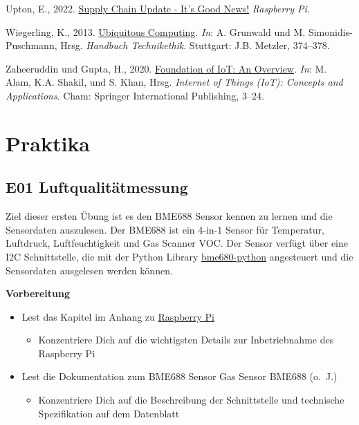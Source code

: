 \documentclass[
  11pt,
  a4paper,
  oneside, openany  ,captions=tableheading
]{scrbook}
\providecommand{\tightlist}{%
  \setlength{\itemsep}{0pt}\setlength{\parskip}{0pt}}
\newlength{\cslhangindent}
\newenvironment{CSLReferences}[2] %
  {\begin{list}{}{%
   \setlength{\itemindent}{0pt}
   \setlength{\leftmargin}{0pt}
   \setlength{\parsep}{0pt}
   \ifodd #1
    \setlength{\leftmargin}{\cslhangindent}
    \setlength{\itemindent}{-1\cslhangindent}
   \fi
   \setlength{\itemsep}{#2\baselineskip}}}
  {\end{list}}
\theoremstyle{remark}
\begin{document}
\begin{CSLReferences}{1}{0}
Upton, E., 2022.
\href{https://www.raspberrypi.com/news/supply-chain-update-its-good-news/}{Supply
Chain Update - It's Good News!} \emph{Raspberry Pi}.

Wiegerling, K., 2013.
\href{https://doi.org/10.1007/978-3-476-05333-6_71}{{Ubiquitous
Computing}}. \emph{In}: A. Grunwald und M. Simonidis-Puschmann, Hrsg.
\emph{{Handbuch Technikethik}}. {Stuttgart}: {J.B. Metzler}, 374--378.

Zaheeruddin und Gupta, H., 2020.
\href{https://doi.org/10.1007/978-3-030-37468-6_1}{Foundation of {IoT}:
{An Overview}}. \emph{In}: M. Alam, K.A. Shakil, und S. Khan, Hrsg.
\emph{Internet of {Things} ({IoT}): {Concepts} and {Applications}}.
{Cham}: {Springer International Publishing}, 3--24.

\end{CSLReferences}

\part{Praktika}

\chapter*{E01 Luftqualitätmessung}\label{e01-luftqualituxe4tmessung}


Ziel dieser ersten Übung ist es den BME688 Sensor kennen zu lernen und
die Sensordaten auszulesen. Der BME688 ist ein 4-in-1 Sensor für
Temperatur, Luftdruck, Luftfeuchtigkeit und Gas Scanner VOC. Der Sensor
verfügt über eine I2C Schnittstelle, die mit der Python Library
\href{https://github.com/pimoroni/bme680-python}{bme680-python}
angesteuert und die Sensordaten ausgelesen werden können.

\textbf{Vorbereitung}

\begin{itemize}
\tightlist
\item
  Lest das Kapitel im Anhang zu \href{A1_Rasperry_Pi.qmd}{Raspberry Pi}

  \begin{itemize}
  \tightlist
  \item
    Konzentriere Dich auf die wichtigsten Details zur Inbetriebnahme des
    Raspberry Pi
  \end{itemize}
\item
  Lest die Dokumentation zum BME688 Sensor Gas Sensor {BME688} (o.~J.)

  \begin{itemize}
  \tightlist
  \item
    Konzentriere Dich auf die Beschreibung der Schnittstelle und
    technische Spezifikation auf dem Datenblatt
  \end{itemize}
\end{itemize}
\end{document}
